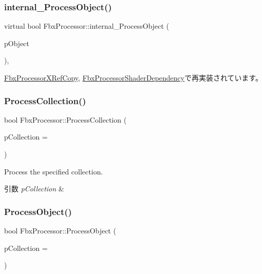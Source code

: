 \subsubsection{\texorpdfstring{internal\+\_\+\+Process\+Object()}{internal\_ProcessObject()}}
{\footnotesize\ttfamily virtual bool Fbx\+Processor\+::internal\+\_\+\+Process\+Object (\begin{DoxyParamCaption}\item[{\hyperlink{class_fbx_object}{Fbx\+Object} $\ast$}]{p\+Object }\end{DoxyParamCaption})\hspace{0.3cm}{\ttfamily [protected]}, {\ttfamily [virtual]}}



\hyperlink{class_fbx_processor_x_ref_copy_a268311daf5a2a29fc7bd2097d8346e5f}{Fbx\+Processor\+X\+Ref\+Copy}, \hyperlink{class_fbx_processor_shader_dependency_a4e6d8ee3e0abd220aeeba254f848f147}{Fbx\+Processor\+Shader\+Dependency}で再実装されています。

\mbox{\label{class_fbx_processor_acb7f2a7c80e823b16d2639d7293fefb3}} 
\subsubsection{\texorpdfstring{Process\+Collection()}{ProcessCollection()}}
{\footnotesize\ttfamily bool Fbx\+Processor\+::\+Process\+Collection (\begin{DoxyParamCaption}\item[{\hyperlink{class_fbx_collection}{Fbx\+Collection} $\ast$}]{p\+Collection = {} }\end{DoxyParamCaption})}

Process the specified collection. 
\begin{DoxyParams}{引数}
{\em p\+Collection} & \\
\hline
\end{DoxyParams}
\mbox{\label{class_fbx_processor_adb5587b39465b31d968f1ba7dd2b2d5f}} 
\subsubsection{\texorpdfstring{Process\+Object()}{ProcessObject()}}
{\footnotesize\ttfamily bool Fbx\+Processor\+::\+Process\+Object (\begin{DoxyParamCaption}\item[{\hyperlink{class_fbx_object}{Fbx\+Object} $\ast$}]{p\+Collection = {} }\end{DoxyParamCaption})}

